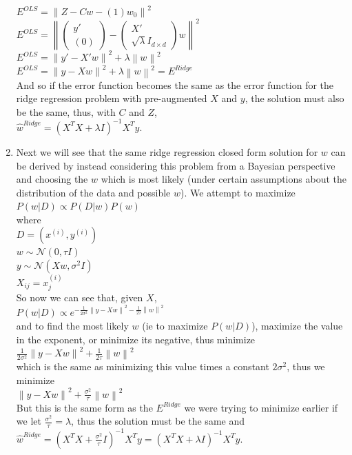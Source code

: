 \documentclass[1pt]{article}
\newcommand{\norm}[1]{\left\lVert#1\right\rVert}
\begin{document}
\begin{enumerate}[label=(\alph*)]
$E^{OLS} =  \norm{Z - Cw - (1)w_0}^2$\\
$E^{OLS} =  \norm{\begin{pmatrix}y'\\ (0)  \end{pmatrix} - \begin{pmatrix}X'\\ \sqrt{\lambda} I_{d \times d} \end{pmatrix}w}^2$\\
$E^{OLS} =  \norm{y' - X'w}^2 +  \lambda \norm{w}^2$\\
$E^{OLS} =  \norm{y - Xw}^2 +  \lambda \norm{w}^2 = E^{Ridge}$\\
And so if the error function becomes the same as the error function for the ridge regression problem with pre-augmented $X$ and $y$, the solution must also be the same, thus, with $C$ and $Z$, \\
$\hat{w}^{Ridge} = (X^TX + \lambda I)^{-1}X^Ty$. 

\item Next we will see that the same ridge regression closed form solution for $w$ can be derived by instead considering this problem from a Bayesian perspective and choosing the $w$ which is most likely (under certain assumptions about the distribution of the data and possible $w$). We attempt to maximize \\
$P(w|D) \propto P(D|w) P(w)$\\
where\\
$D = {(x^{(i)}, y^{(i)})}$\\
$w \sim \mathcal{N}(0,\tau I)$\\
$y \sim \mathcal{N}(Xw,\sigma^2 I)$\\
$X_{ij} = x^{(i)}_j$\\
So now we can see that, given $X$, \\
$P(w|D) \propto e^{-\frac{1}{2 \sigma^2} \norm{y - Xw}^2 -\frac{1}{2 \tau} \norm{w}^2}$ \\
and to find the most likely $w$ (ie to maximize $P(w|D)$), maximize the value in the exponent, or minimize its negative, thus minimize \\
$\frac{1}{2 \sigma^2} \norm{y - Xw}^2 + \frac{1}{2 \tau} \norm{w}^2$ \\
which is the same as minimizing this value times a constant $ 2 \sigma^2$, thus we minimize \\
$\norm{y - Xw}^2 + \frac{\sigma^2}{\tau} \norm{w}^2$ \\
But this is the same form as the $E^{Ridge}$ we were trying to minimize earlier if we let $\frac{\sigma^2}{\tau} = \lambda$, thus the solution must be the same and \\
$\hat{w}^{Ridge} = (X^TX + \frac{\sigma^2}{\tau} I)^{-1}X^Ty = (X^TX + \lambda I)^{-1}X^Ty$. 

\end{enumerate}
\end{document}
